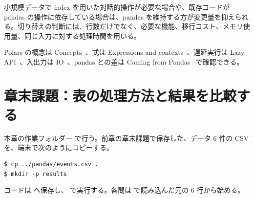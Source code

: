 小規模データで index を用いた対話的操作が必要な場合や、既存コードが pandas の操作に依存している場合は、pandas を維持する方が変更量を抑えられる。切り替えの判断には、行数だけでなく、必要な機能、移行コスト、メモリ使用量、同じ入力に対する処理時間を用いる。

Polars の概念は Concepts~\cite{polars_concepts}、式は Expressions and contexts~\cite{polars_expressions}、遅延実行は Lazy API~\cite{polars_lazy}、入出力は IO~\cite{polars_io}、pandas との差は Coming from Pandas~\cite{polars_from_pandas} で確認できる。

\section{章末課題：表の処理方法と結果を比較する}

本章の作業フォルダー  で行う。前章の章末課題で保存した、データ 6 件の CSV を、端末で次のようにコピーする。
\begin{lstlisting}[numbers=none, xleftmargin=2\zw]
$ cp ../pandas/events.csv .
$ mkdir -p results
\end{lstlisting}
コードは  へ保存し、 で実行する。各問は  で読み込んだ元の 6 行から始める。

